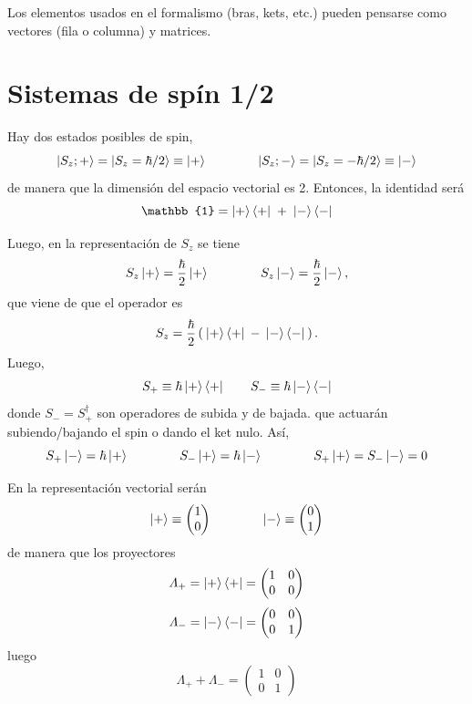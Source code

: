 \documentclass[10pt,oneside]{CBFT_book}
\begin{document}
Los elementos usados en el formalismo (bras, kets, etc.) pueden pensarse como vectores (fila
o columna) y matrices.

\section{Sistemas de spín 1/2}

Hay dos estados posibles de spin,
\[
	\Ket{S_z ; +} = \Ket{S_z = \hbar/2} \equiv \Ket{+} 
	\qquad \qquad 
	\Ket{S_z ; -} = \Ket{S_z = -\hbar/2} \equiv \Ket{-}
\]
de manera que la dimensión del espacio vectorial es 2. 
Entonces, la identidad será 
\[
	\mathbb{1} = \Ket{+}\Bra{+} \; + \;  \Ket{-}\Bra{-}
\]


Luego, en la representación de $S_z$ se tiene
\[
	S_z \ket{+} = \frac{\hbar}{2} \Ket{+} \qquad \qquad 
	S_z \ket{-} = \frac{\hbar}{2} \Ket{-},
\]
que viene de que el operador es
\[
	S_z = \frac{\hbar}{2} \left( \: \Ket{+}\Bra{+} \: - \: \Ket{-}\Bra{-} \: \right).
\]
Luego,
\[
	S_+ \equiv \hbar  \Ket{+}\Bra{+}  \qquad 
	S_- \equiv \hbar  \Ket{-}\Bra{-} 
\]
donde $S_- = S_+^\dagger$ son operadores de subida y de bajada.
que actuarán subiendo/bajando el spin o dando el ket nulo.
Así,
\[
	S_+ \Ket{-} = \hbar \Ket{+} 
	\qquad \qquad  
	S_- \Ket{+} = \hbar \Ket{-} 
	\qquad \qquad 
	S_+ \Ket{+} = S_- \Ket{-} = 0
\]

En la representación vectorial serán
\[
	\Ket{+} \equiv \begin{pmatrix} 1 \\ 0 \end{pmatrix}
	\qquad \qquad 
	\Ket{-} \equiv \begin{pmatrix} 0 \\ 1 \end{pmatrix}
\]
de manera que los proyectores
\[
	\Lambda_+ = \Ket{+}\Bra{+} =  \begin{pmatrix} 1 & 0 \\ 0 & 0 \end{pmatrix}
\]
\[
	\Lambda_- = \Ket{-}\Bra{-} =  \begin{pmatrix} 0 & 0 \\ 0 & 1 \end{pmatrix}
\]
luego
\[
	\Lambda_+ + \Lambda_- = \begin{pmatrix} 1 & 0 \\ 0 & 1 \end{pmatrix}
\]
\end{document}
